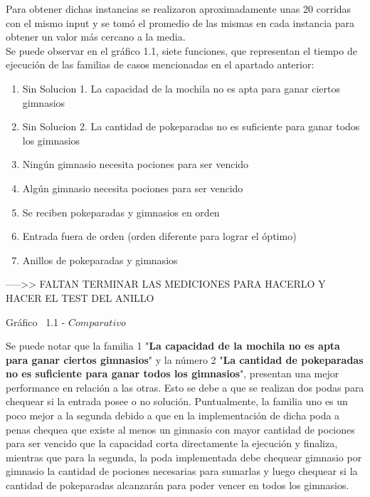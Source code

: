 Para obtener dichas instancias se realizaron aproximadamente unas 20 corridas con el mismo input y se tom\'o el promedio de las mismas en cada instancia para obtener un valor m\'as cercano a la media.\\ 

Se puede observar en el  gráfico 1.1, siete funciones, que representan el tiempo de ejecuci\'on de las familias de casos mencionadas en el apartado anterior:\\

\begin{enumerate}
\item Sin Solucion 1. La capacidad de la mochila no es apta para ganar ciertos gimnasios
\item Sin Solucion 2. La cantidad de pokeparadas no es suficiente para ganar todos los gimnasios
\item Ning\'un gimnasio necesita pociones para ser vencido
\item Alg\'un gimnasio necesita pociones para ser vencido
\item Se reciben pokeparadas y gimnasios en orden
\item Entrada fuera de orden (orden diferente para lograr el óptimo)
\item Anillos de pokeparadas y gimnasios
\end{enumerate}


----->> FALTAN TERMINAR LAS MEDICIONES PARA HACERLO Y HACER EL TEST DEL ANILLO\\
\vspace*{0.3cm} \vspace*{0.3cm}
  \begin{center}
 {Gr\'afico \ 1.1 - $Comparativo$}
  \end{center}
  \vspace*{0.3cm}
  
Se puede notar que la familia 1 "\textbf{La capacidad de la mochila no es apta para ganar ciertos gimnasios}" y la n\'umero 2 "\textbf{La cantidad de pokeparadas no es suficiente para ganar todos los gimnasios}", presentan una mejor performance en relaci\'on a las otras. Esto se debe a que se realizan dos podas para chequear si la entrada posee o no soluci\'on. Puntualmente, la familia uno es un poco mejor a la segunda debido a que en la implementaci\'on de dicha poda a penas chequea que existe al menos un gimnasio con mayor cantidad de pociones para ser vencido que la capacidad corta directamente la ejecuci\'on y finaliza, mientras que para la segunda, la poda implementada debe chequear gimnasio por gimnasio la cantidad de pociones necesarias para sumarlas y luego chequear si la cantidad de pokeparadas alcanzar\'an para poder vencer en todos los gimnasios.\\

